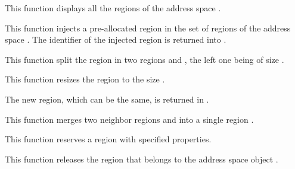 	 {
	   This function displays all the regions of the address space
	   .
	 }

	 {
	   This function injects a pre-allocated region in the set of
	   regions of the address space . The identifier of
	   the injected region is returned into .
	 }

	 {
	   This function split the region  in two regions
	    and , the left one being of size
	   .

	 }

	 {
	   This function resizes the region  to the
	   size .

	   The new region, which can be the same, is returned in
	   .

	 }

	 {
	   This function merges two neighbor regions  and
	    into a single region .

	 }

	 {
	   This function reserves a region with specified properties.

	 }

	 {
	   This function releases the region  that belongs
	   to the address space object .
	 }

